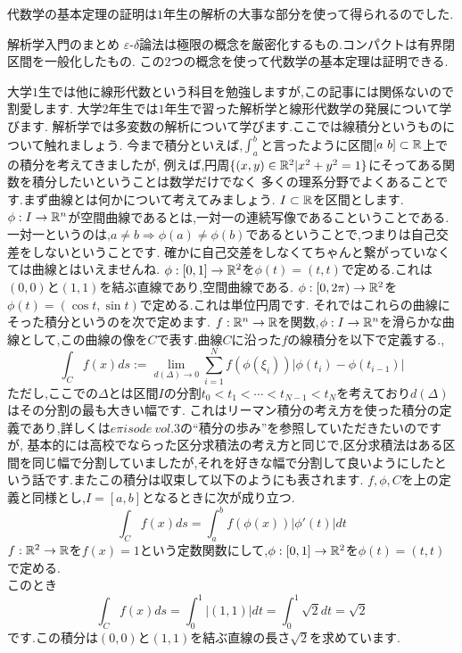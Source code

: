 代数学の基本定理の証明は$1$年生の解析の大事な部分を使って得られるのでした.
\begin{itembox}[l]{解析学入門のまとめ}
$\varepsilon$-$\delta$論法は極限の概念を厳密化するもの.コンパクトは有界閉区間を一般化したもの.
この$2$つの概念を使って代数学の基本定理は証明できる.
\end{itembox}
大学$1$生では他に線形代数という科目を勉強しますが,この記事には関係ないので割愛します.
大学$2$年生では$1$年生で習った解析学と線形代数学の発展について学びます.
解析学では多変数の解析について学びます.ここでは線積分というものについて触れましょう.
今まで積分といえば,$\int_a^b$と言ったように区間$[a\ b]\subset \mathbb R$上での積分を考えてきましたが,
例えば,円周$\{(x,y)\in\mathbb R^2 | x^2+y^2=1\}$にそってある関数を積分したいということは数学だけでなく
多くの理系分野でよくあることです.まず曲線とは何かについて考えてみましょう.
$I\subset\mathbb R$を区間とします.$\phi:I \to \mathbb R^n$が空間曲線であるとは,一対一の連続写像であるこということである.
一対一というのは,$a\neq b \Rightarrow \phi(a) \neq \phi(b)$であるということで,つまりは自己交差をしないということです.
確かに自己交差をしなくてちゃんと繋がっていなくては曲線とはいえませんね.
\ex
$\phi:[0,1] \to \mathbb R^2$を$\phi(t)=(t,t)$で定める.これは$(0,0)$と$(1,1)$を結ぶ直線であり,空間曲線である.
\exx
\ex
$\phi:[0,2\pi) \to \mathbb R^2$を$\phi(t)=(\cos t ,\sin t)$で定める.これは単位円周です.
\exx
それではこれらの曲線にそった積分というのを次で定めます.
$f:\mathbb R^n \to \mathbb R$を関数,$\phi:I\to\mathbb R^n$を滑らかな曲線として,この曲線の像を$C$で表す.曲線$C$に沿った$f$の線積分を以下で定義する.,
\[
\int_C f(x)ds := \lim_{d(\Delta)\to 0} \sum_{i=1}^N f(\phi(\xi_i)) |\phi(t_i) - \phi(t_{i-1})|
\]
ただし,ここでの$\Delta$とは区間$I$の分割$t_0 < t_1 < \cdots < t_{N-1} < t_N$を考えており$d(\Delta)$はその分割の最も大きい幅です.
これはリーマン積分の考え方を使った積分の定義であり,詳しくは$e\pi isode\ vol.3$の``積分の歩み''を参照していただきたいのですが,
基本的には高校でならった区分求積法の考え方と同じで,区分求積法はある区間を同じ幅で分割していましたが,それを好きな幅で分割して良いようにしたという話です.またこの積分は収束して以下のようにも表されます.
\prop
$f,\phi,C$を上の定義と同様とし,$I=[a,b]$となるときに次が成り立つ.
\[
\int_C f(x) ds = \int_a^b f(\phi(x))|\phi'(t)|dt
\]
\propx
\ex
$f:\mathbb R^2\to\mathbb R$を$f(x)=1$という定数関数にして,$\phi:[0,1] \to \mathbb R^2$を$\phi(t)=(t,t)$で定める.\\
このとき
\[
\int_C f(x) ds = \int_0^1 |(1,1)| dt = \int_0^1 \sqrt{2}  dt  = \sqrt{2}
\]
です.この積分は$(0,0)$と$(1,1)$を結ぶ直線の長さ$\sqrt{2}$を求めています.
